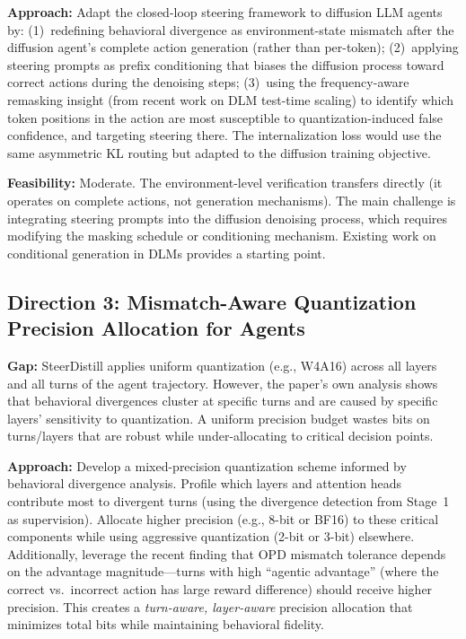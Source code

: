 \documentclass[11pt,a4paper]{article}
\begin{document}
\textbf{Approach:} Adapt the closed-loop steering framework to diffusion LLM agents by: (1)~redefining behavioral divergence as environment-state mismatch after the diffusion agent's complete action generation (rather than per-token); (2)~applying steering prompts as prefix conditioning that biases the diffusion process toward correct actions during the denoising steps; (3)~using the frequency-aware remasking insight (from recent work on DLM test-time scaling) to identify which token positions in the action are most susceptible to quantization-induced false confidence, and targeting steering there. The internalization loss would use the same asymmetric KL routing but adapted to the diffusion training objective.

\textbf{Feasibility:} Moderate. The environment-level verification transfers directly (it operates on complete actions, not generation mechanisms). The main challenge is integrating steering prompts into the diffusion denoising process, which requires modifying the masking schedule or conditioning mechanism. Existing work on conditional generation in DLMs provides a starting point.

\subsection{Direction 3: Mismatch-Aware Quantization Precision Allocation for Agents}
\textbf{Gap:} SteerDistill applies uniform quantization (e.g., W4A16) across all layers and all turns of the agent trajectory. However, the paper's own analysis shows that behavioral divergences cluster at specific turns and are caused by specific layers' sensitivity to quantization. A uniform precision budget wastes bits on turns/layers that are robust while under-allocating to critical decision points.

\textbf{Approach:} Develop a mixed-precision quantization scheme informed by behavioral divergence analysis. Profile which layers and attention heads contribute most to divergent turns (using the divergence detection from Stage~1 as supervision). Allocate higher precision (e.g., 8-bit or BF16) to these critical components while using aggressive quantization (2-bit or 3-bit) elsewhere. Additionally, leverage the recent finding that OPD mismatch tolerance depends on the advantage magnitude---turns with high ``agentic advantage'' (where the correct vs.\ incorrect action has large reward difference) should receive higher precision. This creates a \emph{turn-aware, layer-aware} precision allocation that minimizes total bits while maintaining behavioral fidelity.
\end{document}
